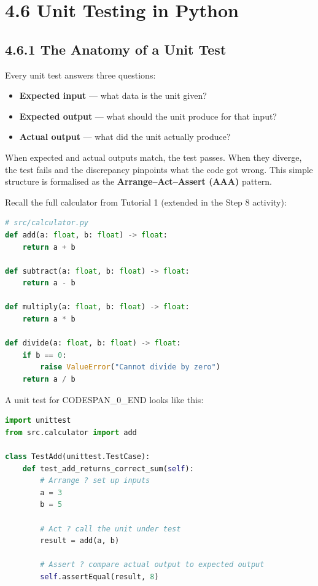 \documentclass[11pt,a4paper]{book}
\begin{document}
\medskip

\section{4.6 Unit Testing in Python}

\subsection{4.6.1 The Anatomy of a Unit Test}

Every unit test answers three questions:

\begin{itemize}
  \item \textbf{Expected input} --- what data is the unit given?
  \item \textbf{Expected output} --- what should the unit produce for that input?
  \item \textbf{Actual output} --- what did the unit actually produce?
\end{itemize}

When expected and actual outputs match, the test passes. When they diverge, the test fails and the discrepancy pinpoints what the code got wrong. This simple structure is formalised as the \textbf{Arrange--Act--Assert (AAA)} pattern.

Recall the full calculator from Tutorial 1 (extended in the Step 8 activity):

\begin{lstlisting}[language=Python]
# src/calculator.py
def add(a: float, b: float) -> float:
    return a + b

def subtract(a: float, b: float) -> float:
    return a - b

def multiply(a: float, b: float) -> float:
    return a * b

def divide(a: float, b: float) -> float:
    if b == 0:
        raise ValueError("Cannot divide by zero")
    return a / b
\end{lstlisting}

A unit test for CODESPAN\_0\_END looks like this:

\begin{lstlisting}[language=Python]
import unittest
from src.calculator import add

class TestAdd(unittest.TestCase):
    def test_add_returns_correct_sum(self):
        # Arrange ? set up inputs
        a = 3
        b = 5

        # Act ? call the unit under test
        result = add(a, b)

        # Assert ? compare actual output to expected output
        self.assertEqual(result, 8)
\end{lstlisting}
\end{document}
